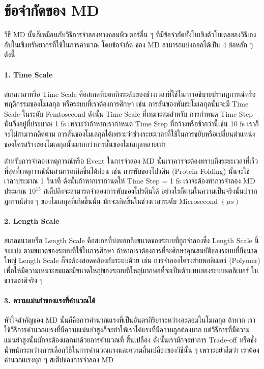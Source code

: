 \section{ข้อจำกัดของ MD}

วิธี MD นั้นก็เหมือนกับวิธีการจำลองทางคอมพิวเตอร์อื่น ๆ ที่มีข้อจำกัดทั้งในเชิงตัวโมเดลของวิธีเองกับในเชิงทรัพยากรที่ใช้ในการคำนวณ โดยข้อจำกัด%
ของ MD สามารถแบ่งออกได้เป็น 4 ข้อหลัก ๆ ดังนี้

\paragraph{1. Time Scale} สเกลเวลาหรือ Time Scale คือสเกลที่บอกถึงระดับของช่วงเวลาที่ใช้ในการอธิบายปรากฎการณ์หรือพฤติกรรมของโมเลกุล%
หรือระบบที่เราต้องการศึกษา เช่น การสั่นของพันธะโมเลกุลนั้นจะมี Time Scale ในระดับ Femtosecond ดังนั้น Time Scale ที่เหมาะสมสำหรับ%
การกำหนด Time Step นั่นจึงอยู่ที่ประมาณ 1 fs เพราะว่าถ้าหากเรากำหนด Time Step ที่กว้างหรือช้ากว่านี้เช่น 10 fs เราก็จะไม่สามารถติดตาม%
การสั่นของโมเลกุลได้เพราะว่าช่วงระยะเวลาที่ใช้ในการขยับหรือเปลี่ยนตำแหน่งของโครสร้างของโมเลกุลนั้นมากกว่าการสั่นของโมเลกุลหลายเท่า

สำหรับการจำลองเหตุการณ์หรือ Event ในการจำลอง MD นั้นเราควรจะต้องทราบถึงระยะเวลาที่เร็วที่สุดที่เหตุการณ์นั้นสามารถเกิดขึ้นได้ก่อน เช่น
การพับของโปรตีน (Protein Folding) นั้นจะใช้เวลาประมาณ 1 วินาที ดังนั้นถ้าหากเรากำนดให้ Time Step = 1 fs เราจะต้องทำการจำลอง
MD ประมาณ $10^{15}$ สเต็ปถึงจะสามารถจำลองการพับของโปรตีนได้ อย่างไรก็ตามในความเป็นจริงนั้นปรากฎการณ์ต่าง ๆ ของโมเลกุลที่เกิดขึ้นนั้น%
มักจะเกิดขึ้นในช่วงเวลาระดับ Microsecond $(\mu s)$

\paragraph{2. Length Scale} สเกลขนาดหรือ Length Scale คือสเกลที่บ่งบอกถึงขนาดของระบบที่ถูกจำลองซึ่ง Length Scale นี้จะแบ่ง%
ตามขนาดของระบบที่ใช้ในการศึกษา ถ้าหากเราต้องการที่จะศึกษาคุณสมบัติของระบบที่มีขนาดใหญ่ Length Scale ก็จะต้องสอดคล้องกับระบบด้วย
เช่น การจำลองโครงข่ายพอลิเมอร์ (Polymer) เพื่อให้มีความเหมาะสมและมีขนาดใหญ่ของระบบที่ใหญ่มากพอที่จะเป็นตัวแทนของระบบพอลิเมอร์%
ในธรรมชาติจริง ๆ

\paragraph{3. ความแม่นยำของแรงที่คำนวณได้} หัวใจสำคัญของ MD นั้นก็คือการคำนวณแรงที่เป็นอันตรกิริยาระหว่างอะตอมในโมเลกุล ถ้าหาก%
เราใช้วิธีการคำนวณแรงที่มีความแม่นยำสูงก็จะทำให้เราได้แรงที่มีความถูกต้องมาก แต่วิธีการที่มีความแม่นยำสูงนั้นมักจะต้องแลกมาด้วยการคำนวณที่%
สิ้นเปลือง ดังนั้นเรามักจะทำการ Trade-off หรือชั่งน้ำหนักระหว่างการเลือกวิธีในการคำนวณแรงและความสิ้นเปลืองของวิธีนั้น ๆ เพราะอย่าลืมว่า%
เราต้องคำนวณแรงทุก ๆ สเต็ปของการจำลอง MD

